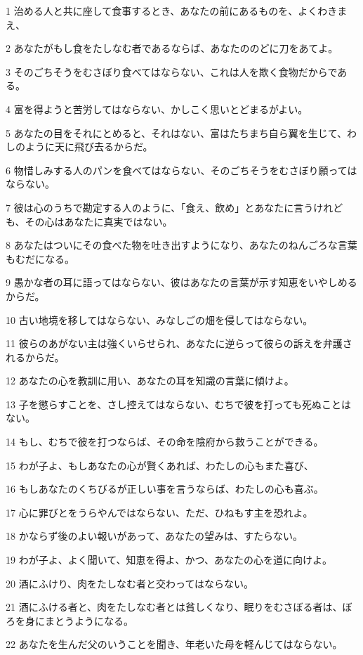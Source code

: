 \par 1 治める人と共に座して食事するとき、あなたの前にあるものを、よくわきまえ、
\par 2 あなたがもし食をたしなむ者であるならば、あなたののどに刀をあてよ。
\par 3 そのごちそうをむさぼり食べてはならない、これは人を欺く食物だからである。
\par 4 富を得ようと苦労してはならない、かしこく思いとどまるがよい。
\par 5 あなたの目をそれにとめると、それはない、富はたちまち自ら翼を生じて、わしのように天に飛び去るからだ。
\par 6 物惜しみする人のパンを食べてはならない、そのごちそうをむさぼり願ってはならない。
\par 7 彼は心のうちで勘定する人のように、「食え、飲め」とあなたに言うけれども、その心はあなたに真実ではない。
\par 8 あなたはついにその食べた物を吐き出すようになり、あなたのねんごろな言葉もむだになる。
\par 9 愚かな者の耳に語ってはならない、彼はあなたの言葉が示す知恵をいやしめるからだ。
\par 10 古い地境を移してはならない、みなしごの畑を侵してはならない。
\par 11 彼らのあがない主は強くいらせられ、あなたに逆らって彼らの訴えを弁護されるからだ。
\par 12 あなたの心を教訓に用い、あなたの耳を知識の言葉に傾けよ。
\par 13 子を懲らすことを、さし控えてはならない、むちで彼を打っても死ぬことはない。
\par 14 もし、むちで彼を打つならば、その命を陰府から救うことができる。
\par 15 わが子よ、もしあなたの心が賢くあれば、わたしの心もまた喜び、
\par 16 もしあなたのくちびるが正しい事を言うならば、わたしの心も喜ぶ。
\par 17 心に罪びとをうらやんではならない、ただ、ひねもす主を恐れよ。
\par 18 かならず後のよい報いがあって、あなたの望みは、すたらない。
\par 19 わが子よ、よく聞いて、知恵を得よ、かつ、あなたの心を道に向けよ。
\par 20 酒にふけり、肉をたしなむ者と交わってはならない。
\par 21 酒にふける者と、肉をたしなむ者とは貧しくなり、眠りをむさぼる者は、ぼろを身にまとうようになる。
\par 22 あなたを生んだ父のいうことを聞き、年老いた母を軽んじてはならない。
